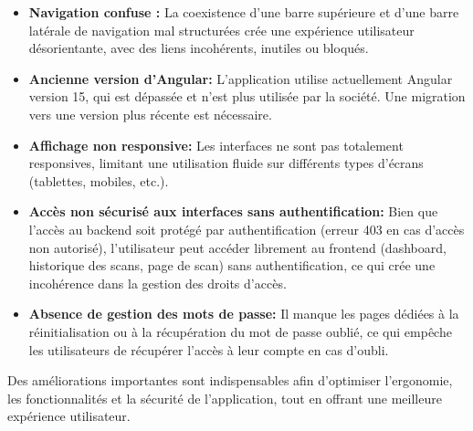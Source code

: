 \begin{itemize}[label=\textcolor{red}{}]
            \item \textbf{Navigation confuse :} La coexistence d’une barre supérieure et d’une barre latérale de navigation mal structurées crée une expérience utilisateur désorientante, avec des liens incohérents, inutiles ou bloqués.
            \item \textbf{Ancienne version d’Angular:}  L’application utilise actuellement Angular version 15, qui est dépassée et n’est plus utilisée par la société. Une migration vers une version plus récente est nécessaire.
            \item \textbf{Affichage non responsive:} Les interfaces ne sont pas totalement responsives, limitant une utilisation fluide sur différents types d’écrans (tablettes, mobiles, etc.).
            \item \textbf{Accès non sécurisé aux interfaces sans authentification:} Bien que l’accès au backend soit protégé par authentification (erreur 403 en cas d’accès non autorisé), l’utilisateur peut accéder librement au frontend (dashboard, historique des scans, page de scan) sans authentification, ce qui crée une incohérence dans la gestion des droits d’accès.
            \item \textbf{Absence de gestion des mots de passe:} Il manque les pages dédiées à la réinitialisation ou à la récupération du mot de passe oublié, ce qui empêche les utilisateurs de récupérer l’accès à leur compte en cas d’oubli.
         \end{itemize}
    Des améliorations importantes sont indispensables afin d’optimiser l’ergonomie, les fonctionnalités et la sécurité de l’application, tout en offrant une meilleure expérience utilisateur.